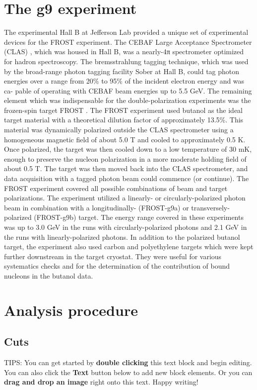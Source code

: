 \documentclass{article}
\begin{document}
\section{The g9 experiment}
The experimental Hall B at Jefferson Lab provided a unique set of experimental devices for the
FROST experiment. The CEBAF Large Acceptance Spectrometer (CLAS)\cite{CLAS} , which was housed
in Hall B, was a nearly-4π spectrometer optimized for hadron spectroscopy. The bremsstrahlung
tagging technique, which was used by the broad-range photon tagging facility Sober\cite{Sober_2000} at Hall B, could
tag photon energies over a range from 20\% to 95\% of the incident electron energy and was ca-
pable of operating with CEBAF beam energies up to 5.5 GeV. The remaining element which was
indispensable for the double-polarization experiments was the frozen-spin target FROST \cite{Keith_2012}. The
FROST experiment used butanol as the ideal target material with a theoretical dilution factor of
approximately 13.5\%. This material was dynamically polarized outside the CLAS spectrometer using a homogeneous magnetic field of about 5.0 T and cooled to approximately 0.5 K. Once polarized,
the target was then cooled down to a low temperature of 30 mK, enough to preserve the nucleon
polarization in a more moderate holding field of about 0.5 T. The target was then moved back
into the CLAS spectrometer, and data acquisition with a tagged photon beam could commence (or
continue). The FROST experiment covered all possible combinations of beam and target polarizations. The experiment utilized a linearly- or circularly-polarized photon beam in combination with
a longitudinally- (FROST-g9a) or transversely-polarized (FROST-g9b) target. The energy range
covered in these experiments was up to 3.0 GeV in the runs with circularly-polarized photons and
2.1 GeV in the runs with linearly-polarized photons. In addition to the polarized butanol target,
the experiment also used carbon and polyethylene targets which were kept further downstream in
the target cryostat. They were useful for various systematics checks and for the determination of
the contribution of bound nucleons in the butanol data.

\section{Analysis procedure}
\subsection{Cuts}



TIPS:
You can get started by \textbf{double clicking} this text block and begin editing. You can also click the \textbf{Text} button below to add new block elements. Or you can \textbf{drag and drop an image} right onto this text. Happy writing!



\end{document}
